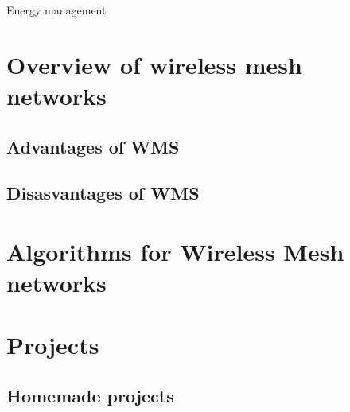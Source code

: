 		Energy management
		
	
	
	\section{Overview of wireless mesh networks}
	
	
	
	
		\subsection{Advantages of WMS}
		
		\subsection{Disasvantages of WMS}
	
	\section{Algorithms for Wireless Mesh networks}
	
						
	
	\section{Projects}
		
		\subsection{Homemade projects}
		
			
